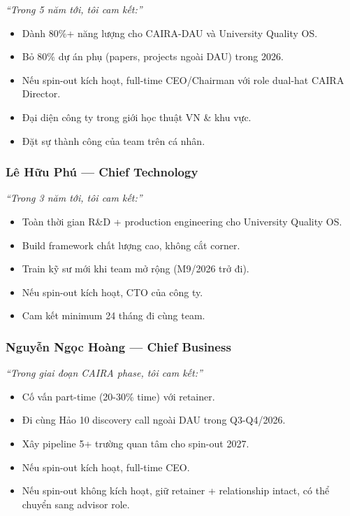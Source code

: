 \documentclass[11pt,a4paper]{article}
\begin{document}
\begin{quotebox}
\textit{``Trong 5 năm tới, tôi cam kết:''}
\begin{itemize}
\item Dành 80\%+ năng lượng cho CAIRA-DAU và University Quality OS.
\item Bỏ 80\% dự án phụ (papers, projects ngoài DAU) trong 2026.
\item Nếu spin-out kích hoạt, full-time CEO/Chairman với role dual-hat CAIRA Director.
\item Đại diện công ty trong giới học thuật VN \& khu vực.
\item Đặt sự thành công của team trên cá nhân.
\end{itemize}
\end{quotebox}

\subsubsection*{Lê Hữu Phú --- Chief Technology}

\begin{quotebox}
\textit{``Trong 3 năm tới, tôi cam kết:''}
\begin{itemize}
\item Toàn thời gian R\&D + production engineering cho University Quality OS.
\item Build framework chất lượng cao, không cắt corner.
\item Train kỹ sư mới khi team mở rộng (M9/2026 trở đi).
\item Nếu spin-out kích hoạt, CTO của công ty.
\item Cam kết minimum 24 tháng đi cùng team.
\end{itemize}
\end{quotebox}

\subsubsection*{Nguyễn Ngọc Hoàng --- Chief Business}

\begin{quotebox}
\textit{``Trong giai đoạn CAIRA phase, tôi cam kết:''}
\begin{itemize}
\item Cố vấn part-time (20-30\% time) với retainer.
\item Đi cùng Hảo 10 discovery call ngoài DAU trong Q3-Q4/2026.
\item Xây pipeline 5+ trường quan tâm cho spin-out 2027.
\item Nếu spin-out kích hoạt, full-time CEO.
\item Nếu spin-out không kích hoạt, giữ retainer + relationship intact, có thể chuyển sang advisor role.
\end{itemize}
\end{quotebox}
\end{document}
